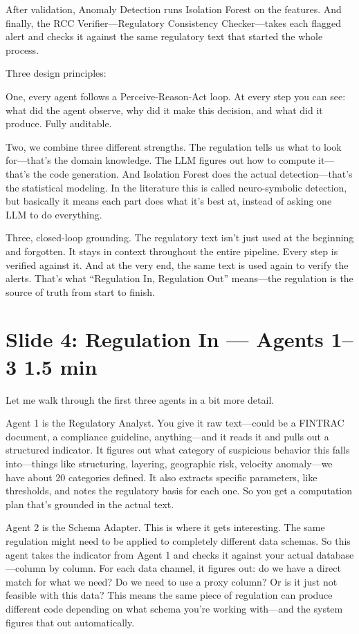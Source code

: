 \documentclass[11pt, a4paper]{article}
\newcommand{\timing}[1]{{\hfill\small\color{gray}#1}}
\begin{document}
After validation, Anomaly Detection runs Isolation Forest on the features. And finally, the RCC Verifier---Regulatory Consistency Checker---takes each flagged alert and checks it against the same regulatory text that started the whole process.

Three design principles:

One, every agent follows a Perceive-Reason-Act loop. At every step you can see: what did the agent observe, why did it make this decision, and what did it produce. Fully auditable.

Two, we combine three different strengths. The regulation tells us what to look for---that's the domain knowledge. The LLM figures out how to compute it---that's the code generation. And Isolation Forest does the actual detection---that's the statistical modeling. In the literature this is called neuro-symbolic detection, but basically it means each part does what it's best at, instead of asking one LLM to do everything.

Three, closed-loop grounding. The regulatory text isn't just used at the beginning and forgotten. It stays in context throughout the entire pipeline. Every step is verified against it. And at the very end, the same text is used again to verify the alerts. That's what ``Regulation In, Regulation Out'' means---the regulation is the source of truth from start to finish.

\section{Slide 4: Regulation In --- Agents 1--3 \timing{1.5 min}}

Let me walk through the first three agents in a bit more detail.

Agent 1 is the Regulatory Analyst. You give it raw text---could be a FINTRAC document, a compliance guideline, anything---and it reads it and pulls out a structured indicator. It figures out what category of suspicious behavior this falls into---things like structuring, layering, geographic risk, velocity anomaly---we have about 20 categories defined. It also extracts specific parameters, like thresholds, and notes the regulatory basis for each one. So you get a computation plan that's grounded in the actual text.

Agent 2 is the Schema Adapter. This is where it gets interesting. The same regulation might need to be applied to completely different data schemas. So this agent takes the indicator from Agent 1 and checks it against your actual database---column by column. For each data channel, it figures out: do we have a direct match for what we need? Do we need to use a proxy column? Or is it just not feasible with this data? This means the same piece of regulation can produce different code depending on what schema you're working with---and the system figures that out automatically.
\end{document}
